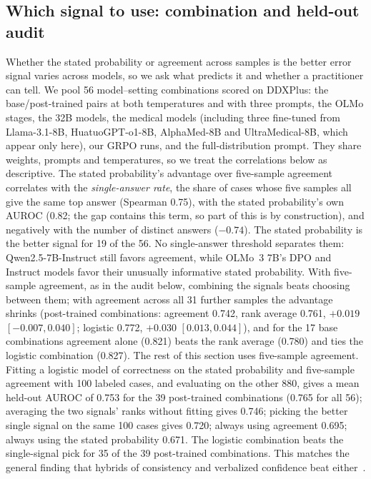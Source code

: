 \documentclass[wcp]{jmlr}
\begin{document}
\subsection{Which signal to use: combination and held-out audit}\label{sec:audit}
Whether the stated probability or agreement across samples is the better error signal varies across models, so we ask what predicts it and whether a practitioner can tell. We pool 56 model--setting combinations scored on DDXPlus: the base/post-trained pairs at both temperatures and with three prompts, the OLMo stages, the 32B models, the medical models (including three fine-tuned from Llama-3.1-8B, HuatuoGPT-o1-8B, AlphaMed-8B and UltraMedical-8B, which appear only here), our GRPO runs, and the full-distribution prompt. They share weights, prompts and temperatures, so we treat the correlations below as descriptive.
The stated probability's advantage over five-sample agreement correlates with the \emph{single-answer rate}, the share of cases whose five samples all give the same top answer (Spearman 0.75), with the stated probability's own AUROC (0.82; the gap contains this term, so part of this is by construction), and negatively with the number of distinct answers ($-0.74$). The stated probability is the better signal for 19 of the 56. No single-answer threshold separates them: Qwen2.5-7B-Instruct still favors agreement, while OLMo~3 7B's DPO and Instruct models favor their unusually informative stated probability.
With five-sample agreement, as in the audit below, combining the signals beats choosing between them; with agreement across all 31 further samples the advantage shrinks (post-trained combinations: agreement 0.742, rank average 0.761, $+0.019$ $[-0.007,0.040]$; logistic 0.772, $+0.030$ $[0.013,0.044]$), and for the 17 base combinations agreement alone (0.821) beats the rank average (0.780) and ties the logistic combination (0.827). The rest of this section uses five-sample agreement. Fitting a logistic model of correctness on the stated probability and five-sample agreement with 100 labeled cases, and evaluating on the other 880, gives a mean held-out AUROC of 0.753 for the 39 post-trained combinations (0.765 for all 56); averaging the two signals' ranks without fitting gives 0.746; picking the better single signal on the same 100 cases gives 0.720; always using agreement 0.695; always using the stated probability 0.671. The logistic combination beats the single-signal pick for 35 of the 39 post-trained combinations. This matches the general finding that hybrids of consistency and verbalized confidence beat either~\citep{xiong2024express}.
\end{document}
